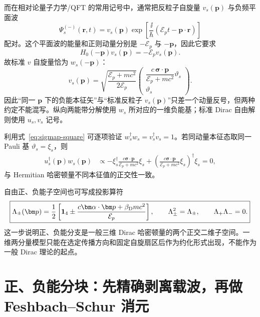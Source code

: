 而在相对论量子力学/QFT 的常用记号中，通常把反粒子自旋量 $v_s(\bm p)$ 与负频平面波
\begin{equation}
\Psi_s^{(-)}(\bm r,t)
=v_s(\bm p)
\exp\!\left[\frac{\ii}{\hbar}
(\mathcal E_p t-\bm p\cdot\bm r)\right]
\label{eq:standard-negative-frequency-wave}
\end{equation}
配对。这个平面波的能量和正则动量分别是 $-\mathcal E_p$ 与 $-\bm p$，因此它要求
\begin{equation}
H_0(-\bm p)v_s(\bm p)=-\mathcal E_p v_s(\bm p).
\end{equation}
故标准 $v$ 自旋量恰为 $w_s(-\bm p)$：
\begin{equation}
\boxed{
v_s(\bm p)=
\sqrt{\frac{\mathcal E_p+mc^2}{2\mathcal E_p}}
\begin{pmatrix}
\dfrac{c\,\bm\sigma\cdot\bm p}{\mathcal E_p+mc^2}\vartheta_s\\[0.45em]
\vartheta_s
\end{pmatrix}.}
\label{eq:v-standard}
\end{equation}
因此“同一 $\bm p$ 下的负能本征矢”与“标准反粒子 $v_s(\bm p)$”只差一个动量反号，但两种约定不能混写。纵向两能带分解使用 $w_s$ 所对应的一维负能基；标准 Dirac 自由解则使用 $u_s,v_s$ 记号。

利用式~\eqref{eq:sigmap-square} 可逐项验证 $w_s^\dagger w_s=v_s^\dagger v_s=1$。若同动量本征态取同一 Pauli 基 $\vartheta_s=\xi_s$，则
\begin{align}
u_s^\dagger(\bm p)w_s(\bm p)
&\propto
-\xi_s^\dagger\frac{c\bm\sigma\cdot\bm p}{\mathcal E_p+mc^2}\xi_s
+\left(\frac{c\bm\sigma\cdot\bm p}{\mathcal E_p+mc^2}\xi_s\right)^\dagger\xi_s
=0,
\end{align}
与 Hermitian 哈密顿量不同本征值的正交性一致。

自由正、负能子空间也可写成投影算符
\begin{equation}
 \boxed{
 \Lambda_\pm(\bm p)
 =\frac12\left[
 \mathbf 1_4\pm
 \frac{c\bm\alpha\cdot\bm p+\beta_{\rm D}mc^2}{\mathcal E_p}
 \right],
 \qquad
 \Lambda_\pm^2=\Lambda_\pm,
 \qquad
 \Lambda_+\Lambda_-=0.}
 \label{eq:dirac-projectors}
\end{equation}
这一步说明正、负能分支是一般三维 Dirac 哈密顿量的两个正交二维子空间。一维两分量模型只能在选定传播方向和固定自旋扇区后作为约化形式出现，不能作为一般 Dirac 理论的起点。



\section{正、负能分块：先精确剥离载波，再做 Feshbach--Schur 消元}

